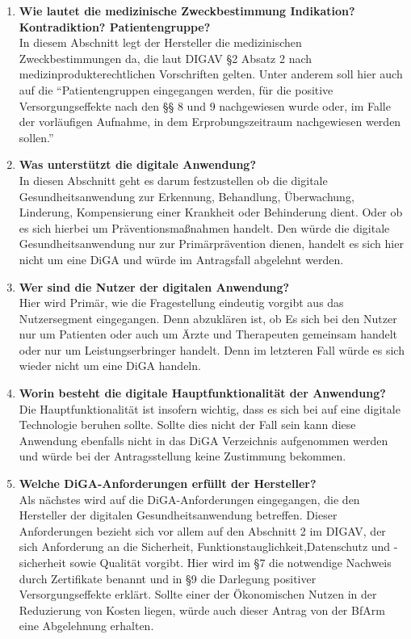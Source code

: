 \begin{enumerate}
	\item \textbf{Wie lautet die medizinische Zweckbestimmung Indikation? Kontradiktion? Patientengruppe?}
	\\In diesem Abschnitt legt der Hersteller die medizinischen Zweckbestimmungen da, die laut DIGAV §2 Absatz 2 nach medizinprodukterechtlichen Vorschriften gelten. Unter anderem soll hier auch auf die ``Patientengruppen eingegangen werden, für die positive Versorgungseffekte nach den §§ 8 und 9 nachgewiesen wurde oder, im Falle der vorläufigen Aufnahme, in dem Erprobungszeitraum nachgewiesen werden sollen.'' \cite{Verordnung}
	\item \textbf{Was unterstützt die digitale Anwendung?}
	\\In diesen Abschnitt geht es darum festzustellen ob die digitale Gesundheitsanwendung zur Erkennung, Behandlung, Überwachung, Linderung, Kompensierung einer Krankheit oder Behinderung dient. Oder ob es sich hierbei um Präventionsmaßnahmen handelt. Den würde die digitale Gesundheitsanwendung nur zur Primärprävention dienen, handelt es sich hier nicht um eine DiGA und würde im Antragsfall abgelehnt werden.
	\item \textbf{Wer sind die Nutzer der digitalen Anwendung?}
	\\Hier wird Primär, wie die Fragestellung eindeutig vorgibt aus das Nutzersegment eingegangen. Denn abzuklären ist, ob Es sich bei den Nutzer nur um Patienten oder auch um Ärzte und Therapeuten gemeinsam handelt oder nur um Leistungserbringer handelt. Denn im letzteren Fall würde es sich wieder nicht um eine DiGA handeln.
	\item \textbf{Worin besteht die digitale Hauptfunktionalität der Anwendung?}
	\\Die Hauptfunktionalität ist insofern wichtig, dass es sich bei auf eine digitale Technologie beruhen sollte. Sollte dies nicht der Fall sein kann diese Anwendung ebenfalls nicht in das DiGA Verzeichnis aufgenommen werden und würde bei der Antragsstellung keine Zustimmung bekommen.
	\item \textbf{Welche DiGA-Anforderungen erfüllt der Hersteller?}
	\\Als nächstes wird auf die DiGA-Anforderungen eingegangen, die den Hersteller der digitalen Gesundheitsanwendung betreffen. Dieser Anforderungen bezieht sich vor allem auf den Abschnitt 2 im DIGAV, der sich Anforderung an die Sicherheit, Funktionstauglichkeit,Datenschutz und -sicherheit sowie Qualität vorgibt. Hier wird im §7 die notwendige Nachweis durch Zertifikate benannt und in §9 die Darlegung positiver Versorgungseffekte erklärt. Sollte einer der Ökonomischen Nutzen in der Reduzierung von Kosten liegen, würde auch dieser Antrag von der BfArm eine Abgelehnung erhalten.

\end{enumerate}
